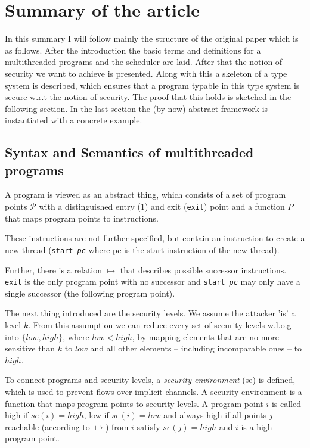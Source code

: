 \documentclass[a4paper,10pt]{llncs}
\begin{document}
\section{Summary of the article}
\label{sec:discussion}
In this summary I will follow mainly the structure of the original
paper\cite{Barthe07} which is as follows. After the introduction the basic
terms and definitions for a multithreaded programs and the scheduler are
laid. After that the notion of security we want to achieve is presented.
Along with this a skeleton of a type system is described, which ensures
that a program typable in this type system is secure w.r.t the notion of
security. The proof that this holds is sketched in the following section.
In the last section the (by now) abstract framework is instantiated with a
concrete example.

\subsection{Syntax and Semantics of multithreaded programs}
\label{sec:syntaxsemantics}
A program is viewed as an abstract thing, which consists of a set of
program points $\mathcal{P}$ with a distinguished entry ($1$) and exit
(\texttt{exit}) point and a function $P$ that maps program points to
instructions.

These instructions are not further specified, but contain an instruction
to create a new thread (\texttt{start \textit{pc}} where pc is the start
instruction of the new thread).

Further, there is a relation $\mapsto$ that describes possible successor
instructions. \texttt{exit} is the only program point with no successor
and \texttt{start \textit{pc}} may only have a single successor (the
following program point).

The next thing introduced are the security levels. We assume the attacker
'is' a level $k$. From this assumption we can reduce every set of security levels
w.l.o.g into $\{low, high\}$, where $low < high$, by mapping elements
that are no more sensitive than $k$ to $low$ and all other elements
-- including incomparable ones -- to $high$.

To connect programs and security levels, a \textit{security environment}
(se) is defined, which is used to prevent flows over implicit channels.
A security environment is a function that maps program points to security
levels. A program point $i$ is called high if $se(i) = high$, low if $se(i)
= low$ and always high if all points $j$ reachable (according to $\mapsto$)
from $i$ satisfy $se(j) = high$ and $i$ is a high program point.
\end{document}
